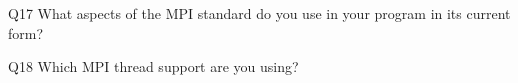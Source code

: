 \begin{description}%
\item{Q17} What aspects of the MPI standard do you use in your program in its current form?%
\item{Q18} Which MPI thread support are you using?%
\end{description}%
